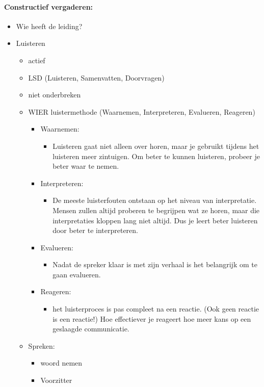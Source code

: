 \documentclass[12pt]{article}
\begin{document}
\paragraph{Constructief vergaderen:}
\begin{itemize}
    \item Wie heeft de leiding?
    \item Luisteren\begin{itemize}
        \item actief
        \item LSD (Luisteren, Samenvatten, Doorvragen)
        \item niet onderbreken
        \item WIER luistermethode (Waarnemen, Interpreteren, Evalueren, Reageren)\begin{itemize}
            \item Waarnemen:\begin{itemize}
                \item Luisteren gaat niet alleen over horen, maar je gebruikt tijdens het luisteren meer zintuigen. Om beter te kunnen luisteren, probeer je beter waar te nemen.
            \end{itemize}
            \item Interpreteren:\begin{itemize}
                \item De meeste luisterfouten ontstaan op het niveau van interpretatie. Mensen zullen altijd proberen te begrijpen wat ze horen, maar die interpretaties kloppen lang niet altijd. Dus je leert beter luisteren door beter te interpreteren.
            \end{itemize}
            \item Evalueren:\begin{itemize}
                \item Nadat de spreker klaar is met zijn verhaal is het belangrijk om te gaan evalueren.
            \end{itemize}
            \item Reageren:\begin{itemize}
                \item het luisterproces is pas compleet na een reactie. (Ook geen reactie is een reactie!) Hoe effectiever je reageert hoe meer kans op een geslaagde communicatie.
            \end{itemize}
        \end{itemize}
        \item Spreken:\begin{itemize}
            \item woord nemen
            \item Voorzitter
        \end{itemize}
    \end{itemize}
\end{itemize}
\end{document}
